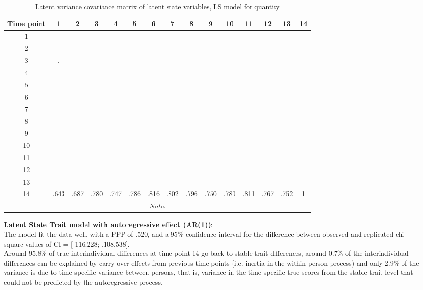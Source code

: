 \begin{table}[H]
 \setlength{\tabcolsep}{1mm}
 \begin{center}
        \caption[Correlation latent State quant]{Latent variance covariance matrix of latent state variables, LS model for quantity}
        \label{Tab: correlations LS quant}
            {\footnotesize
            \begin{tabular}{ccccccccccccccc}
            \hline       
           Time point  & 1 &2&3&4&5&6&7&8&9&10&11&12&13&14 \\
           \hline
           1 & &&&&&&&&&&&&& \\
           2 & &&&&&&&&&&&&& \\
           3 & .&&&&&&&&&&&&& \\
           4 &&&&&&&&&&&&&& \\
           5 & &&&&&&&&&&&&& \\
           6 &&&&&&&&&&&&&& \\
           7 & &&&&&&&&&&&&& \\
            8 & &&&&&&&&&&&&& \\
            9 & &&&&&&&&&&&&& \\
           10 & &&&&&&&&&&&&& \\
           11 &&&&&&&&&&&&&& \\
           12 &&&&&&&&&&&&&& \\
            13 & &&&&&&&&&&&&& \\
            14 & .643&.687&.780&.747&.786&.816&.802&.796&.750&.780&.811&.767&.752&1 \\
 \hline 
\multicolumn{15}{p{0.65\textwidth}}{\scriptsize{\textit{Note.}}} \\
            \end{tabular}}
        \end{center}
        \end{table}


\textbf{Latent State Trait model with autoregressive effect (AR(1))}: \\

The model fit the data well, with a PPP of .520, and a 95\% confidence interval for the difference between observed and replicated chi-square values of CI =  [-116.228; .108.538].  \\
Around 95.8\% of true interindividual differences at time point 14 go back to stable trait differences, around 0.7\% of the interindividual differences can be explained by carry-over effects from previous time points (i.e. inertia in the within-person process) and only 2.9\% of the variance is due to time-specific variance between persons, that is, variance in the time-specific true scores from the stable trait level that could not be predicted by the autoregressive process. \\


